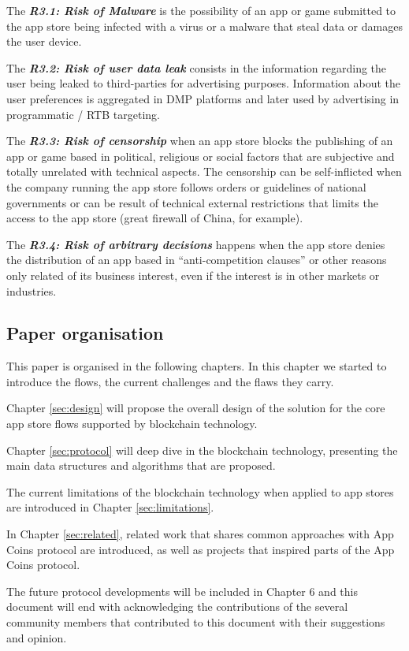 \begin{tcolorbox}[enhanced jigsaw,sharp corners, drop fuzzy shadow=ShadowColor]

The {\bf\em R3.1: Risk of Malware} is the possibility of an app or game submitted to the app store being infected with a virus or a malware that steal data or damages the user device.

The {\bf\em R3.2: Risk of user data leak} consists in the information regarding the user being leaked to third-parties for advertising purposes. Information about the user preferences is aggregated in DMP platforms and later used by advertising in programmatic / RTB targeting.


The {\bf\em R3.3: Risk of censorship} when an app store blocks the publishing of an app or game based in political, religious or social factors that are subjective and totally unrelated with technical aspects. The censorship can be self-inflicted when the company running the app store follows orders or guidelines of national governments or can be result of technical external restrictions that limits the access to the app store (great firewall of China, for example).

The {\bf\em R3.4: Risk of arbitrary decisions} happens when the app store denies the distribution of an app based in ``anti-competition clauses'' \cite{PlayTermsService} or other reasons only related of its business interest, even if the interest is in other markets or industries.

\end{tcolorbox}

\subsection{Paper organisation}

This paper is organised in the following chapters. In this chapter we started to introduce the flows, the current challenges and the flaws they carry.

Chapter \ref{sec:design} will propose the overall design of the solution for the core app store flows supported by blockchain technology. 

Chapter \ref{sec:protocol} will deep dive in the blockchain technology, presenting the main data structures and algorithms that are proposed.

The current limitations of the blockchain technology when applied to app stores are introduced in Chapter \ref{sec:limitations}.

In Chapter \ref{sec:related}, related work that shares common approaches with App Coins protocol are introduced, as well as projects that inspired parts of the App Coins protocol.


The future protocol developments will be included in Chapter 6 and this document will end with acknowledging the contributions of the several community members that contributed to this document with their suggestions and opinion.


